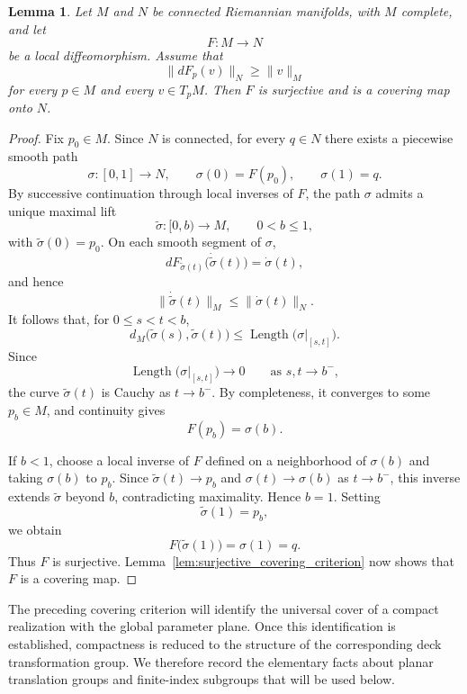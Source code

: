 \documentclass[a4paper,11pt]{amsart}
\numberwithin{equation}{section}
\theoremstyle{plain}
\newtheorem{lem}[thm]{Lemma}
\begin{document}
\begin{lem}\label{lem:covering_criterion}
Let $M$ and $N$ be connected Riemannian manifolds, with $M$ complete,
and let
\[
F:M\longrightarrow N
\]
be a local diffeomorphism. Assume that
\[
\lVert dF_p(v)\rVert_N
\geq
\lVert v\rVert_M
\]
for every $p\in M$ and every $v\in T_pM$. Then $F$ is surjective and
is a covering map onto $N$.
\end{lem}

\begin{proof}
Fix $p_0\in M$. Since $N$ is connected, for every $q\in N$ there
exists a piecewise smooth path
\[
\sigma:[0,1]\longrightarrow N,
\qquad
\sigma(0)=F(p_0),
\qquad
\sigma(1)=q.
\]
By successive continuation through local inverses of $F$, the path
$\sigma$ admits a unique maximal lift
\[
\widetilde\sigma:[0,b)\longrightarrow M,
\qquad
0<b\leq1,
\]
with $\widetilde\sigma(0)=p_0$. On each smooth segment of $\sigma$,
\[
dF_{\widetilde\sigma(t)}
\bigl(\dot{\widetilde\sigma}(t)\bigr)
=
\dot\sigma(t),
\]
and hence
\[
\lVert\dot{\widetilde\sigma}(t)\rVert_M
\leq
\lVert\dot\sigma(t)\rVert_N.
\]
It follows that, for $0\leq s<t<b$,
\[
d_M\bigl(\widetilde\sigma(s),\widetilde\sigma(t)\bigr)
\leq
\operatorname{Length}\bigl(\sigma|_{[s,t]}\bigr).
\]
Since
\[
\operatorname{Length}\bigl(\sigma|_{[s,t]}\bigr)\longrightarrow0
\qquad\text{as }s,t\longrightarrow b^-,
\]
the curve $\widetilde\sigma(t)$ is Cauchy as $t\to b^-$. By
completeness, it converges to some $p_b\in M$, and continuity gives
\[
F(p_b)=\sigma(b).
\]

If $b<1$, choose a local inverse of $F$ defined on a neighborhood of
$\sigma(b)$ and taking $\sigma(b)$ to $p_b$. Since
$\widetilde\sigma(t)\to p_b$ and $\sigma(t)\to\sigma(b)$ as
$t\to b^-$, this inverse extends $\widetilde\sigma$ beyond $b$,
contradicting maximality. Hence $b=1$. Setting
\[
\widetilde\sigma(1)=p_b,
\]
we obtain
\[
F\bigl(\widetilde\sigma(1)\bigr)=\sigma(1)=q.
\]
Thus $F$ is surjective. Lemma~\ref{lem:surjective_covering_criterion}
now shows that $F$ is a covering map.
\end{proof}

The preceding covering criterion will identify the universal cover of a
compact realization with the global parameter plane. Once this
identification is established, compactness is reduced to the structure
of the corresponding deck transformation group. We therefore record
the elementary facts about planar translation groups and finite-index
subgroups that will be used below.
\end{document}
